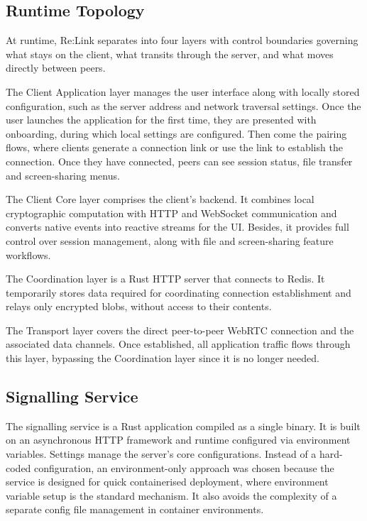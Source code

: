 \documentclass[12pt,a4paper,oneside]{report}
\begin{document}
\subsection{Runtime Topology}
\label{sec:runtime-topology}

At runtime, Re:Link separates into four layers with control boundaries governing what stays on the client, what transits through the server, and what moves directly between peers.

The Client Application layer manages the user interface along with locally stored configuration, such as the server address and network traversal settings. Once the user launches the application for the first time, they are presented with onboarding, during which local settings are configured. Then come the pairing flows, where clients generate a connection link or use the link to establish the connection. Once they have connected, peers can see session status, file transfer and screen-sharing menus.

The Client Core layer comprises the client's backend. It combines local cryptographic computation with HTTP and WebSocket communication and converts native events into reactive streams for the UI. Besides, it provides full control over session management, along with file and screen-sharing feature workflows.

The Coordination layer is a Rust HTTP server that connects to Redis. It temporarily stores data required for coordinating connection establishment and relays only encrypted blobs, without access to their contents.

The Transport layer covers the direct peer-to-peer WebRTC connection and the associated data channels. Once established, all application traffic flows through this layer, bypassing the Coordination layer since it is no longer needed.


\subsection{Signalling Service}
\label{sec:signalling-service}

The signalling service is a Rust application compiled as a single binary. It is built on an asynchronous HTTP framework and runtime configured via environment variables. Settings manage the server's core configurations. Instead of a hard-coded configuration, an environment-only approach was chosen because the service is designed for quick containerised deployment, where environment variable setup is the standard mechanism. It also avoids the complexity of a separate config file management in container environments.
\end{document}
